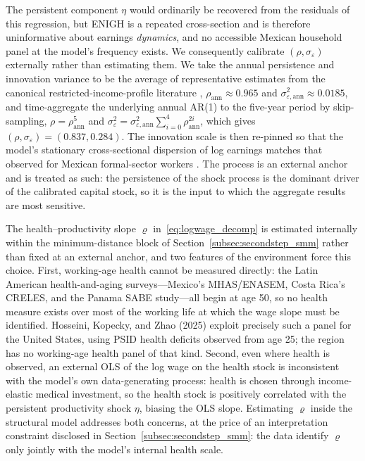 \documentclass[12pt,a4paper]{article}
\begin{document}
The persistent component $\eta$ would ordinarily be recovered from the residuals of this regression, but ENIGH is a repeated cross-section and is therefore uninformative about earnings \emph{dynamics}, and no accessible Mexican household panel at the model's frequency exists. We consequently calibrate $(\rho,\sigma_\varepsilon)$ externally rather than estimating them. We take the annual persistence and innovation variance to be the average of representative estimates from the canonical restricted-income-profile literature \citep{StoreslettenTelmerYaron2004, Guvenen2009, HubbardSkinnerZeldes1994}, $\rho_{\mathrm{ann}}\approx0.965$ and $\sigma^2_{\varepsilon,\mathrm{ann}}\approx0.0185$, and time-aggregate the underlying annual AR(1) to the five-year period by skip-sampling, $\rho=\rho_{\mathrm{ann}}^5$ and $\sigma_\varepsilon^2=\sigma^2_{\varepsilon,\mathrm{ann}}\sum_{i=0}^{4}\rho_{\mathrm{ann}}^{2i}$, which gives $(\rho,\sigma_\varepsilon)=(0.837,0.284)$. The innovation scale is then re-pinned so that the model's stationary cross-sectional dispersion of log earnings matches that observed for Mexican formal-sector workers \citep{Puggioni2022}. The process is an external anchor and is treated as such: the persistence of the shock process is the dominant driver of the calibrated capital stock, so it is the input to which the aggregate results are most sensitive.

The health--productivity slope $\varrho$ in~\eqref{eq:logwage_decomp} is estimated internally within the minimum-distance block of Section~\ref{subsec:secondstep_smm} rather than fixed at an external anchor, and two features of the environment force this choice. First, working-age health cannot be measured directly: the Latin American health-and-aging surveys---Mexico's MHAS/ENASEM, Costa Rica's CRELES, and the Panama SABE study---all begin at age 50, so no health measure exists over most of the working life at which the wage slope must be identified. Hosseini, Kopecky, and Zhao (2025) exploit precisely such a panel for the United States, using PSID health deficits observed from age 25; the region has no working-age health panel of that kind. Second, even where health is observed, an external OLS of the log wage on the health stock is inconsistent with the model's own data-generating process: health is chosen through income-elastic medical investment, so the health stock is positively correlated with the persistent productivity shock $\eta$, biasing the OLS slope. Estimating $\varrho$ inside the structural model addresses both concerns, at the price of an interpretation constraint disclosed in Section~\ref{subsec:secondstep_smm}: the data identify $\varrho$ only jointly with the model's internal health scale.
\end{document}
